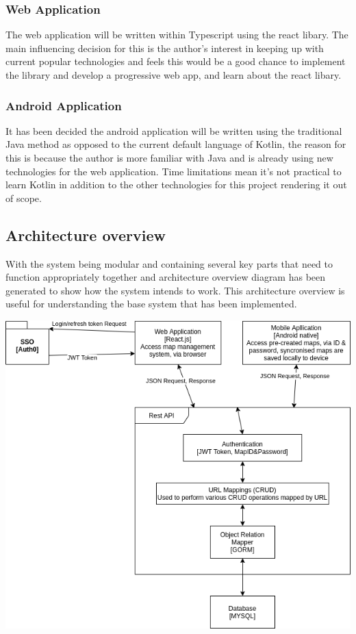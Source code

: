 \subsubsection{Web Application}
The web application will be written within Typescript using the react libary. The main influencing decision for this is the author's interest in keeping up with current popular technologies and feels this would be a good chance to implement the library and develop a progressive web app, and learn about the react libary.

\subsubsection{Android Application}
It has been decided the android application will be written using the traditional Java method as opposed to the current default language of Kotlin, the reason for this is because the author is more familiar with Java and is already using new technologies for the web application. Time limitations mean it's not practical to learn Kotlin in addition to the other technologies for this project rendering it out of scope.

\pagebreak
\subsection{Architecture overview}
With the system being modular and containing several key parts that need to function appropriately together and architecture overview diagram has been generated to show how the system intends to work. This architecture overview is useful for understanding the base system that has been implemented.

\includegraphics[width=\linewidth]{./images/designs/ArchitectureOverview.png}

